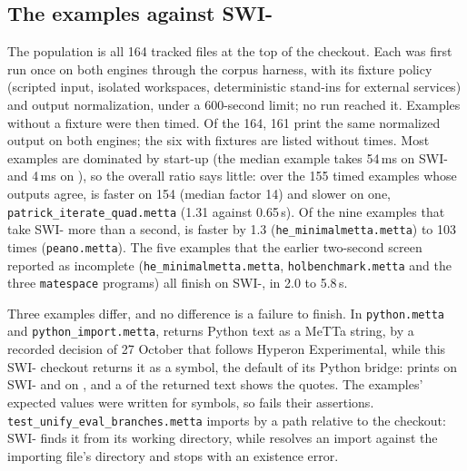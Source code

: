 \subsection{The \PeTTa{} examples against SWI-\PeTTa{}}
\label{app:runtimes-examples}

The population is all 164 tracked  files at the top of
the \PeTTa{} checkout.  Each was first run once on both engines through the
corpus harness, with its fixture policy (scripted input, isolated
workspaces, deterministic stand-ins for external services) and output
normalization, under a 600-second limit; no run reached it.  Examples without a
fixture were then timed.  Of the 164, 161 print the same normalized output on both
engines; the six with fixtures are listed without times.  Most examples are
dominated by start-up (the median example takes 54\,ms on SWI-\PeTTa{} and
4\,ms on \CeTTa{}), so the overall ratio says little: over the 155 timed examples whose outputs agree,
\CeTTa{} is faster on 154 (median factor 14) and slower on one,
\nolinkurl{patrick_iterate_quad.metta} (1.31 against 0.65\,s).  Of the nine
examples that take SWI-\PeTTa{} more than a second, \CeTTa{} is faster by 1.3
(\nolinkurl{he_minimalmetta.metta}) to 103 times (\nolinkurl{peano.metta}).
The five examples that the earlier two-second screen reported as incomplete
(\nolinkurl{he_minimalmetta.metta}, \nolinkurl{holbenchmark.metta} and the three
\nolinkurl{matespace} programs) all finish on SWI-\PeTTa{}, in 2.0 to 5.8\,s.

Three examples differ, and no difference is a failure to finish.  In
\nolinkurl{python.metta} and \nolinkurl{python_import.metta}, \CeTTa{}
returns Python text as a MeTTa string, by a recorded decision of 27 October
that follows Hyperon Experimental, while this SWI-\PeTTa{} checkout returns it
as a symbol, the default of its Python bridge:  prints
 on SWI-\PeTTa{} and  on \CeTTa{}, and a 
of the returned text shows the quotes.  The examples' expected values were
written for symbols, so \CeTTa{} fails their assertions.
\nolinkurl{test_unify_eval_branches.metta} imports  by a
path relative to the \PeTTa{} checkout: SWI-\PeTTa{} finds it from its
working directory, while \CeTTa{} resolves an import against the importing
file's directory and stops with an existence error.

